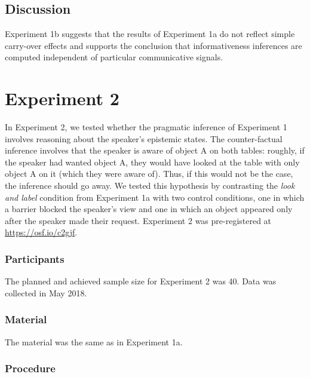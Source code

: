 \documentclass[
  man,floatsintext]{apa6}
\begin{document}
\hypertarget{discussion-1}{%
\subsection{Discussion}\label{discussion-1}}

Experiment 1b suggests that the results of Experiment 1a do not reflect simple carry-over effects and supports the conclusion that informativeness inferences are computed independent of particular communicative signals.

\hypertarget{experiment-2}{%
\section{Experiment 2}\label{experiment-2}}

In Experiment 2, we tested whether the pragmatic inference of Experiment 1 involves reasoning about the speaker's epistemic states. The counter-factual inference involves that the speaker is aware of object A on both tables: roughly, if the speaker had wanted object A, they would have looked at the table with only object A on it (which they were aware of). Thus, if this would not be the case, the inference should go away. We tested this hypothesis by contrasting the \emph{look and label} condition from Experiment 1a with two control conditions, one in which a barrier blocked the speaker's view and one in which an object appeared only after the speaker made their request. Experiment 2 was pre-registered at \url{https://osf.io/c2gjf}.

\hypertarget{participants-2}{%
\subsubsection{Participants}\label{participants-2}}

The planned and achieved sample size for Experiment 2 was 40. Data was collected in May 2018.

\hypertarget{material-2}{%
\subsubsection{Material}\label{material-2}}

The material was the same as in Experiment 1a.

\hypertarget{procedure-2}{%
\subsubsection{Procedure}\label{procedure-2}}
\end{document}
